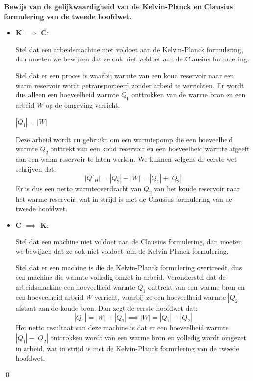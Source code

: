 \begin{derivation}
    \textbf{Bewijs van de gelijkwaardigheid van de Kelvin-Planck en Clausius formulering van de tweede hoofdwet.}
\begin{itemize}
    \item \textbf{K \(\implies\) C}: 
    
    Stel dat een arbeidsmachine niet voldoet aan de Kelvin-Planck formulering, dan moeten we bewijzen dat ze ook niet voldoet aan de Clausius formulering.

    Stel dat er een proces is waarbij warmte van een koud reservoir naar een warm reservoir wordt getransporteerd zonder arbeid te verrichten. 
    Er wordt dus alleen een hoeveelheid warmte \(Q_1\) onttrokken van de warme bron en een arbeid \(W\) op de omgeving verricht.

        \(|Q_1| =  |W|\) 
    
    Deze arbeid wordt nu gebruikt om een warmtepomp die een hoeveelheid warmte \(Q_2\) onttrekt van een koud reservoir en een hoeveelheid warmte afgeeft aan een warm reservoir te laten werken.
    We kunnen volgens de eerste wet schrijven dat:
    \[|Q'_H | = |Q_2| + |W| = |Q_1| + |Q_2|\]
    Er is dus een netto warmteoverdracht van \(Q_2\) van het koude reservoir naar het warme reservoir, wat in strijd is met de Clausius formulering van de tweede hoofdwet.
    
    \item \textbf{C \(\implies\) K}: 
    
    Stel dat een machine niet voldoet aan de Clausius formulering, dan moeten we bewijzen dat ze ook niet voldoet aan de Kelvin-Planck formulering.

    Stel dat er een machine is die de Kelvin-Planck formulering overtreedt, dus een machine die warmte volledig omzet in arbeid. 
    Veronderstel dat de arbeidsmachine een hoeveelheid warmte \(Q_1\) onttrekt van een warme bron en een hoeveelheid arbeid \(W\) verricht, waarbij ze een hoeveelheid warmte \(|Q_2|\) afstaat aan de koude bron.
    Dan zegt de eerste hoofdwet dat:
    \[|Q_1| = |W| + |Q_2| \implies |W| = |Q_1| - |Q_2|\]
    Het netto resultaat van deze machine is dat er een hoeveelheid warmte \(|Q_1|-|Q_2|\) onttrokken wordt van een warme bron en volledig wordt omgezet in arbeid, wat in strijd is met de Kelvin-Planck formulering van de tweede hoofdwet.
\end{itemize}
\qed
\end{derivation}
